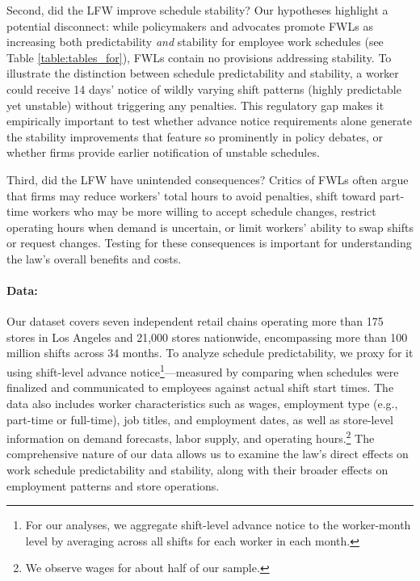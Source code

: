 \documentclass[letterpaper,11pt,leqno]{article}
\theoremstyle{paper}
\begin{document}
Second, did the LFW improve schedule stability? Our hypotheses highlight a potential disconnect: while policymakers and advocates promote FWLs as increasing both predictability \textit{and} stability for employee work schedules (see Table \ref{table:tables_for}), FWLs contain no provisions addressing stability. To illustrate the distinction between schedule predictability and stability, a worker could receive 14 days' notice of wildly varying shift patterns (highly predictable yet unstable) without triggering any penalties. This regulatory gap makes it empirically important to test whether advance notice requirements alone generate the stability improvements that feature so prominently in policy debates, or whether firms provide earlier notification of unstable schedules.

Third, did the LFW have unintended consequences? Critics of FWLs often argue that firms may reduce workers' total hours to avoid penalties, shift toward part-time workers who may be more willing to accept schedule changes, restrict operating hours when demand is uncertain, or limit workers' ability to swap shifts or request changes. Testing for these consequences is important for understanding the law's overall benefits and costs. 

\paragraph{Data:}
Our dataset covers seven independent retail chains operating more than 175 stores in Los Angeles and 21,000 stores nationwide, encompassing more than 100 million shifts across 34 months. To analyze schedule predictability, we proxy for it using shift-level advance notice\footnote{For our analyses, we aggregate shift-level advance notice to the worker-month level by averaging across all shifts for each worker in each month.}—measured by comparing when schedules were finalized and communicated to employees against actual shift start times. The data also includes worker characteristics such as wages, employment type (e.g., part-time or full-time), job titles, and employment dates, as well as store-level information on demand forecasts, labor supply, and operating hours.\footnote{We observe wages for about half of our sample.} The comprehensive nature of our data allows us to examine the law's direct effects on work schedule predictability and stability, along with their broader effects on employment patterns and store operations.
\end{document}

